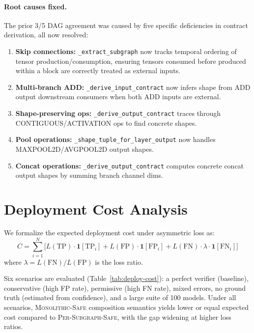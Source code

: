 \documentclass[11pt]{article}
\begin{document}
\paragraph{Root causes fixed.}
The prior 3/5 DAG agreement was caused by five specific deficiencies
in contract derivation, all now resolved:
\begin{enumerate}[leftmargin=2em,nosep]
  \item \textbf{Skip connections:} \texttt{\_extract\_subgraph} now
    tracks temporal ordering of tensor production/consumption,
    ensuring tensors consumed before produced within a block are
    correctly treated as external inputs.
  \item \textbf{Multi-branch ADD:} \texttt{\_derive\_input\_contract}
    now infers shape from ADD output downstream consumers when both
    ADD inputs are external.
  \item \textbf{Shape-preserving ops:} \texttt{\_derive\_output\_contract}
    traces through CONTIGUOUS/ACTIVATION ops to find concrete shapes.
  \item \textbf{Pool operations:} \texttt{\_shape\_tuple\_for\_layer\_output}
    now handles MAXPOOL2D/AVGPOOL2D output shapes.
  \item \textbf{Concat operations:} \texttt{\_derive\_output\_contract}
    computes concrete concat output shapes by summing branch channel dims.
\end{enumerate}


\section{Deployment Cost Analysis}\label{app:deploy-cost}

We formalize the expected deployment cost under asymmetric loss as:
\[
  C = \sum_{i=1}^{N} \bigl[
    L(\mathrm{TP}) \cdot \mathbf{1}[\text{TP}_i]
    + L(\mathrm{FP}) \cdot \mathbf{1}[\text{FP}_i]
    + L(\mathrm{FN}) \cdot \lambda \cdot \mathbf{1}[\text{FN}_i]
  \bigr]
\]
where $\lambda = L(\mathrm{FN})/L(\mathrm{FP})$ is the loss ratio.

Six scenarios are evaluated (Table~\ref{tab:deploy-cost}): a perfect
verifier (baseline), conservative (high FP rate), permissive (high FN
rate), mixed errors, no ground truth (estimated from confidence), and
a large suite of 100 models.  Under all scenarios,
\textsc{Monolithic-Safe} composition semantics yields lower or equal
expected cost compared to \textsc{Per-Subgraph-Safe}, with the gap
widening at higher loss ratios.
\end{document}

